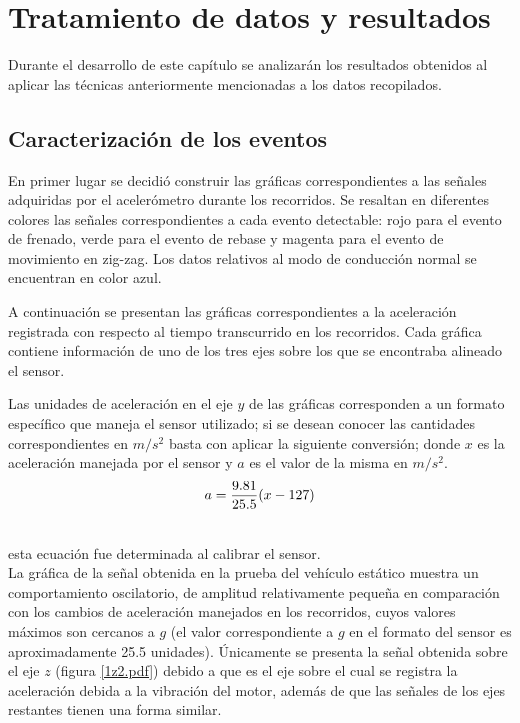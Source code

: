 \chapter{Tratamiento de datos y resultados} 

Durante el desarrollo de este capítulo se analizarán los resultados obtenidos al aplicar las técnicas anteriormente mencionadas a los datos recopilados.

\section{Caracterización de los eventos}

En primer lugar se decidió construir las gráficas correspondientes a las señales adquiridas por el acelerómetro durante los recorridos.
Se resaltan en diferentes colores las señales correspondientes a cada evento detectable: rojo para el evento de frenado, verde para el evento de rebase y magenta para el evento de movimiento en zig-zag. 
Los datos relativos al modo de conducción normal se encuentran en color azul. 

A continuación se presentan las gráficas correspondientes a la aceleración registrada con respecto al tiempo transcurrido en los recorridos. 
Cada gráfica contiene información de uno de los tres ejes sobre los que se encontraba alineado el sensor.

Las unidades de aceleración en el eje $y$ de las gráficas corresponden a un formato específico que maneja el sensor utilizado; si se desean conocer las cantidades correspondientes en $m/s^2$ basta con aplicar la siguiente conversión; donde $x$ es la aceleración manejada por el sensor y $a$ es el valor de la misma en $m/s^2$.\\

$$a={9.81\over 25.5}(x-127)$$

\ \\

esta ecuación fue determinada al calibrar el sensor.\\

La gráfica de la señal obtenida en la prueba del vehículo estático muestra un comportamiento oscilatorio, de amplitud relativamente pequeña en comparación con los cambios de aceleración manejados en los recorridos, cuyos valores máximos son cercanos a $g$ (el valor correspondiente a $g$ en el formato del sensor es aproximadamente 25.5 unidades).
Únicamente se presenta la señal obtenida sobre el eje $z$ (figura \ref{1z2.pdf}) debido a que es el eje sobre el cual se registra la aceleración debida a la vibración del motor, además de que las señales de los ejes restantes tienen una forma similar.
\vspace{12.2cm}

